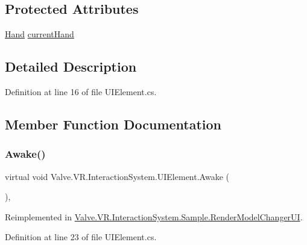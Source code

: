 \subsection*{Protected Attributes}
\begin{DoxyCompactItemize}
\item 
\mbox{\hyperlink{class_valve_1_1_v_r_1_1_interaction_system_1_1_hand}{Hand}} \mbox{\hyperlink{class_valve_1_1_v_r_1_1_interaction_system_1_1_u_i_element_ae9b3f4e376147d62b135e0854f3f5c2b}{current\+Hand}}
\end{DoxyCompactItemize}


\subsection{Detailed Description}


Definition at line 16 of file U\+I\+Element.\+cs.



\subsection{Member Function Documentation}
\mbox{\label{class_valve_1_1_v_r_1_1_interaction_system_1_1_u_i_element_a85ab59351314bba761c53a89f249e246}} 
\subsubsection{\texorpdfstring{Awake()}{Awake()}}
{\footnotesize\ttfamily virtual void Valve.\+V\+R.\+Interaction\+System.\+U\+I\+Element.\+Awake (\begin{DoxyParamCaption}{ }\end{DoxyParamCaption})\hspace{0.3cm}{\ttfamily [protected]}, {\ttfamily [virtual]}}



Reimplemented in \mbox{\hyperlink{class_valve_1_1_v_r_1_1_interaction_system_1_1_sample_1_1_render_model_changer_u_i_a67f90d46a8a14997ee227030d2d0c458}{Valve.\+V\+R.\+Interaction\+System.\+Sample.\+Render\+Model\+Changer\+UI}}.



Definition at line 23 of file U\+I\+Element.\+cs.

